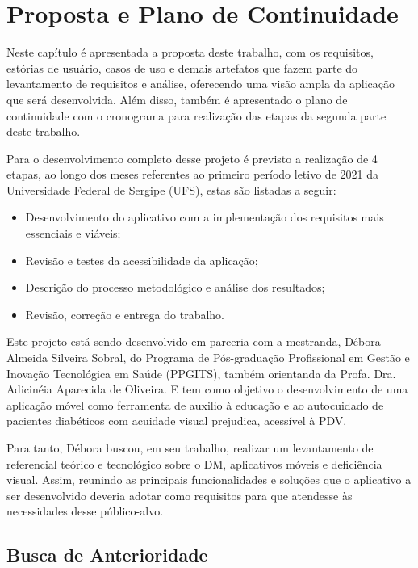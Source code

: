 \chapter{Proposta e Plano de Continuidade}

Neste capítulo é apresentada a proposta deste trabalho, com os requisitos, estórias de usuário, casos de uso e demais artefatos
que fazem parte do levantamento de requisitos e análise, oferecendo uma visão ampla da aplicação que será desenvolvida.
Além disso, também é apresentado o plano de continuidade com o cronograma para realização das etapas da segunda parte deste
trabalho.

Para o desenvolvimento completo desse projeto é previsto a realização de 4 etapas, ao longo dos meses referentes ao primeiro
período letivo de 2021 da Universidade Federal de Sergipe (UFS), estas são listadas a seguir:
\begin{itemize}
    \item Desenvolvimento do aplicativo com a implementação dos requisitos mais essenciais e viáveis;
    \item Revisão e testes da acessibilidade da aplicação;
    \item Descrição do processo metodológico e análise dos resultados;
    \item Revisão, correção e entrega do trabalho.
\end{itemize}

Este projeto está sendo desenvolvido em parceria com a mestranda, Débora Almeida Silveira Sobral, do
Programa de Pós-graduação Profissional em Gestão e Inovação Tecnológica em Saúde (PPGITS), também orientanda da Profa.
Dra. Adicinéia Aparecida de Oliveira. E tem como objetivo
o desenvolvimento de uma aplicação móvel como ferramenta de auxilio à educação e ao autocuidado de pacientes diabéticos
com acuidade visual prejudica, acessível à PDV\@.

Para tanto, Débora buscou, em seu trabalho, realizar um levantamento de referencial teórico e tecnológico sobre o DM,
aplicativos móveis e deficiência visual. Assim, reunindo as principais funcionalidades e soluções que o aplicativo a ser
desenvolvido deveria adotar como requisitos para que atendesse às necessidades desse público-alvo.

\newpage

\section{Busca de Anterioridade}

